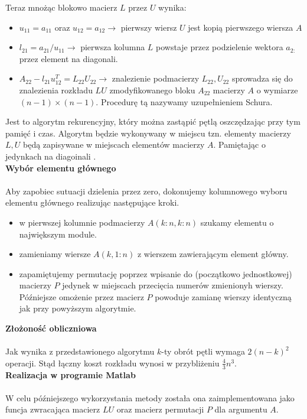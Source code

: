 \documentclass[a4paper, 11pt]{article}
\begin{document}
Teraz mnożąc blokowo macierz $L$ przez $U$ wynika:
\begin{itemize}
\item $u_{11} = a_{11}$ oraz $u_{12} = a_{12} \to $ pierwszy wiersz $U$ jest kopią pierwszego wiersza $A$
\item $l_{21} = a_{21}/u_{11} \to$ pierwsza kolumna $L$ powstaje przez podzielenie wektora $a_{2:}$ przez element na diagonali.
\item $A_{22} - l_{21}u_{12}^T = L_{22}U_{22} \to$ znalezienie podmacierzy $L_{22} , U_{22}$ sprowadza się do znalezienia rozkładu $LU$ zmodyfikowanego bloku $A_{22}$ macierzy $A$ o wymiarze $(n-1)\times(n-1)$. Procedurę tą nazywamy uzupełnieniem Schura.
\end{itemize}

Jest to algorytm rekurencyjny, który można zastąpić pętlą oszczędzając przy tym pamięć i czas. Algorytm będzie wykonywany w miejscu tzn. elementy macierzy $L,U$ będą zapisywane w miejscach elementów macierzy $A$. Pamiętając o jedynkach na diagoinali .\\


\textbf{Wybór elementu głównego}\\
\\
Aby zapobiec sutuacji dzielenia przez zero, dokonujemy kolumnowego wyboru elementu głównego realizując następujące kroki. 
\begin{itemize}
\item w pierwszej kolumnie podmacierzy $A(k:n,k:n)$ szukamy elementu o największym module. 
\item zamieniamy wiersze $A(k,1:n)$ z wierszem zawierającym element główny.
\item zapamiętujemy permutację poprzez wpisanie do (początkowo jednostkowej) macierzy $P$ jedynek w miejscach przecięcia numerów zmienionyh wierszy. Późniejsze omożenie przez macierz $P$ powoduje zamianę wierszy identyczną jak przy powyższym algorytmie. 
\end{itemize}

\textbf{Złożoność obliczniowa}\\
\\
Jak wynika z przedstawionego algorytmu $k$-ty obrót pętli wymaga $2(n-k)^2$ operacji. Stąd łączny koszt rozkładu wynosi w przybliżeniu $\frac{4}{3}n^3$.\\

\textbf{Realizacja w programie Matlab}\\
\\
W celu późniejszego wykorzystania metody została ona zaimplementowana jako funcja zwracająca macierz $LU$ oraz macierz permutacji $P$ dla argumentu $A$.
\end{document}
